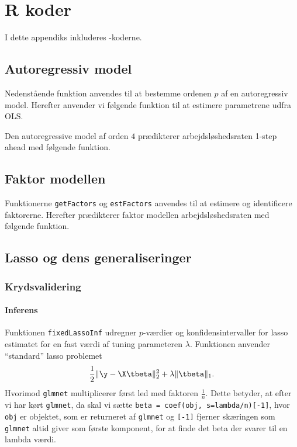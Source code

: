 \chapter{R koder} \label{app:r_koder}
I dette appendiks inkluderes \Rlang-koderne. 

\section{Autoregressiv model} \label{sec:auto}
Nedenstående funktion anvendes til at bestemme ordenen $p$ af en autoregressiv model.  
%
Herefter anvender vi følgende funktion til at estimere parametrene udfra OLS. 

Den autoregressive model af orden \(4\) prædikterer arbejdsløshedsraten 1-step ahead med følgende funktion. 

\section{Faktor modellen} \label{sec:faktor}
Funktionerne \texttt{getFactors} og \texttt{estFactors} anvendes til at estimere og identificere faktorerne. 
%
%
Herefter prædikterer faktor modellen arbejdsløshedsraten med følgende funktion.


\section{Lasso og dens generaliseringer} \label{sec:lasso}

\subsection{Krydsvalidering} \label{sec:krydsvalidering}

\subsubsection{Inferens} \label{subsubsec:inferens}
Funktionen \texttt{fixedLassoInf} udregner \(p\)-værdier og konfidensintervaller for lasso estimatet for en fast værdi af tuning parameteren \(\lambda\).
Funktionen anvender ``standard'' lasso problemet
\begin{align*}
\frac{1}{2} \Vert \y - \X \tbeta \Vert_2^2 + \lambda \Vert \tbeta \Vert_1.
\end{align*}
Hvorimod \texttt{glmnet} multiplicerer først led med faktoren \(\frac{1}{n}\).
Dette betyder, at efter vi har kørt \texttt{glmnet}, da skal vi sætte \texttt{beta = coef(obj, s=lambda/n)[-1]}, hvor \texttt{obj} er objektet, som er returneret af \texttt{glmnet} og \texttt{[-1]} fjerner skæringen som \texttt{glmnet} altid giver som første komponent, for at finde det beta der svarer til en lambda værdi.
%
%

